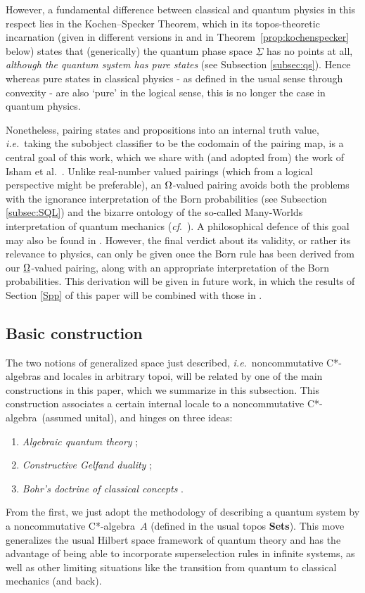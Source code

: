 \documentclass[12pt]{article}
\newcommand{\Sets}{\mbox{\textbf{Sets}}}
\newcommand{\ca}{C*-algebra} \newcommand{\jba}{JB-algebra}
\newcommand{\functor}[1]{\ensuremath{\underline{#1}}}
\newcommand{\ie}{\textit{i.e.}}
\newcommand{\ulS}{\functor{\Sigma}}
\begin{document}
However, a fundamental difference between classical and quantum physics in this
respect lies in the Kochen--Specker Theorem, which in its topos-theoretic
incarnation (given in different versions in \cite{butterfieldisham1} and in
Theorem~\ref{prop:kochenspecker} below)
states that (generically) the quantum phase space  $\ulS$ has no points at all,
{\it although the quantum system has pure states}
(see Subsection \ref{subsec:qs}). Hence whereas pure states in classical physics
- as defined in the usual sense through convexity  - are also  `pure' in the
logical sense, this is no longer the case in
quantum physics.

Nonetheless, pairing states and propositions into an internal truth value, \ie\
taking the subobject classifier to be the codomain of the pairing map,
is a central goal of this work, which we share with (and adopted from) the work
of Isham et al.\ \cite{butterfieldisham1,doringisham1}. Unlike real-number
valued pairings (which from a logical perspective might be preferable), an
$\Omega$-valued pairing
avoids both the problems with the ignorance interpretation of the Born
probabilities (see Subsection
\ref{subsec:SQL}) and the bizarre ontology of the so-called
Many-Worlds interpretation of quantum mechanics
(\textit{cf}.~\cite{Bub,ButVat}). A philosophical defence of this goal
may also be found in \cite{ButProc}. However, the final verdict about its
validity, or rather its relevance to physics, can only be given once
the Born rule has been derived from our  $\underline{\Omega}$-valued
pairing, along with an appropriate interpretation of the Born probabilities.
 This derivation will be given in future work, in which the
results of Section \ref{Spp} of this paper will be combined with those
in \cite{NPLBorn}.
\subsection{Basic construction}\label{sec:Bohr}
The two notions of generalized space just described, \ie\ noncommutative \ca s
and  locales in arbitrary topoi,
will be related by one of the main constructions in this paper, which we
 summarize in this subsection.
 This construction associates a certain  internal locale to a noncommutative
\ca\ (assumed unital), and hinges on three ideas:
\begin{enumerate}
\item {\it Algebraic quantum theory}
\cite{Emch,Haag:LQP,landsman98};
\item {\it Constructive Gelfand duality}
\cite{banaschewskimulvey00b,banaschewskimulvey00a,banaschewskimulvey06,
coquand05,CoquandSpitters:cstar};
\item {\it Bohr's doctrine of classical concepts}
\cite{bohr49,scheibe,landsman07}.
\end{enumerate}
From the first, we just adopt the methodology of describing a quantum system by
a
noncommutative \ca\ $A$ (defined in the usual topos \Sets). This move
generalizes the usual Hilbert space framework of quantum theory and has the
advantage of being able to incorporate superselection rules in infinite systems,
as well as other limiting situations like the transition from  quantum to
classical mechanics (and back).
\end{document}

